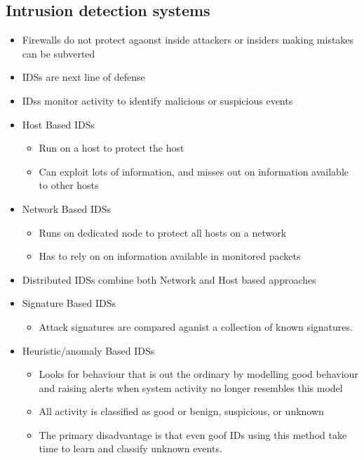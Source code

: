 \documentclass[twoside]{article}
\begin{document}
\subsection{Intrusion detection systems}
\begin{itemize}
\item Firewalls do not protect agaonst inside attackers or insiders making mistakes can be subverted
\item IDSs are next line of defense
\item IDss monitor activity to identify malicious or suspicious events
\item Host Based IDSs
\begin{itemize}
\item Run on a host to protect the host 
\item Can exploit lots of information, and misses out on information available to other hosts
\end{itemize}
\item Network Based IDSs
\begin{itemize}
\item Runs on dedicated node to protect all hosts on a network 
\item Has to rely on on information available in monitored packets
\end{itemize}
\item Distributed IDSs combine both Network and Host based approaches
\item Signature Based IDSs
\begin{itemize}
\item Attack signatures are compared aganist a collection of known signatures. 
\end{itemize}
\item Heuristic/anomaly Based IDSs
\begin{itemize}
\item Looks for behaviour that is out the ordinary by modelling good behaviour and raising alerts when system activity no longer resembles this model
\item  All activity is classified as good or benign, suspicious, or unknown
\item  The primary disadvantage is that even goof IDs using this method take time to learn and classify unknown events. 
\end{itemize}
\end{itemize}
\end{document}
